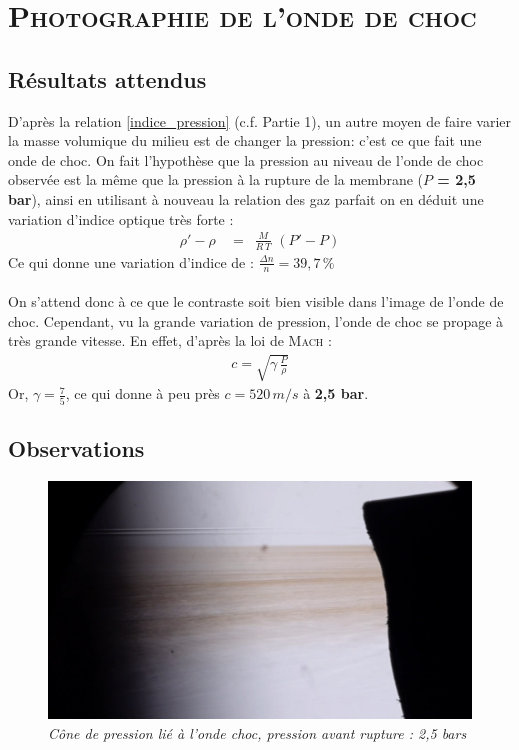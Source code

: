 \renewcommand{\chaptername}{\scshape Partie}
\chapter{\normalfont \scshape Photographie de l'onde de choc}
\section{Résultats attendus}
D’après la relation \ref{indice_pression} (c.f. Partie 1), un autre moyen de faire varier la masse volumique du milieu est de changer la pression: c’est ce que fait une onde de choc. On fait l’hypothèse que la pression au niveau de l’onde de choc observée est la même que la pression à la rupture de la membrane (\textbf{$P$ = 2,5 bar}), ainsi en utilisant à nouveau la relation des gaz parfait on en déduit une variation d’indice optique très forte  :
\begin{align}
	\rho' - \rho \,&= \,\,\,\frac{M}{R \, T}\,\,(P'-P)
\end{align}
Ce qui donne une variation d'indice de : $\frac{\Delta n}{n} = 39,7\,\%$\\ \\
On s'attend donc à ce que le contraste soit bien visible dans l'image de l'onde de choc. Cependant, vu la grande variation de pression, l'onde de choc se propage à très grande vitesse. En effet, d'après la loi de \textsc{Mach} :
\begin{align}
	c= \sqrt{\gamma\,\frac{P}{\rho}}
\end{align}
Or, \textbf{$\gamma = \frac{7}{5}$}, ce qui donne à peu près \textbf{$c=520\, m/s$} à \textbf{2,5 bar}.
\section{Observations}
\begin{figure}[H]
	\centering
	\includegraphics[scale = 0.15]{figures/choc_schlieren.jpg}
	\caption{\small{\textit{Cône de pression lié à l'onde choc, pression avant rupture : 2,5 bars}}}
	\label{choc_schlieren}
\end{figure}